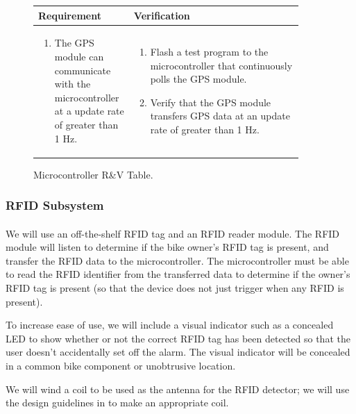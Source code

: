 \documentclass{article}
\begin{document}
\begin{figure}[H]
	\begin{center}
		\begin{tabular}{|p{0.3 \linewidth}|p{0.6 \linewidth}|}
			\hline
			Requirement & Verification  \\
			\hline
			\begin{enumerate}
				\item   The GPS module can communicate with the microcontroller at a update rate of greater than 1 Hz.  
			\end{enumerate} &
			\begin{enumerate}
				\item  Flash a test program to the microcontroller that continuously polls the GPS module.
				\item Verify that the GPS module transfers GPS data at an update rate of greater than 1 Hz.
			\end{enumerate}  \\
			\hline 
		\end{tabular}
	\end{center}
	\caption{Microcontroller R\&V Table.}
\end{figure}

\subsubsection{RFID Subsystem}


\paragraph{} We will use an off-the-shelf RFID tag and an RFID reader module. The RFID module will listen to determine if the bike owner's RFID tag is present, and transfer the RFID data to the microcontroller. The microcontroller must be able to read the RFID identifier from the transferred data to determine if the owner's RFID tag is present (so that the device does not just trigger when any RFID is present). 

To increase ease of use, we will include a visual indicator such as a concealed LED to show whether or not the correct RFID tag has been detected so that the user doesn't accidentally set off the alarm. The visual indicator will be concealed in a common bike component or unobtrusive location. 


We will wind a coil to be used as the antenna for the RFID detector; we will use the design guidelines in \cite{rfid} to make an appropriate coil. 
\end{document}
